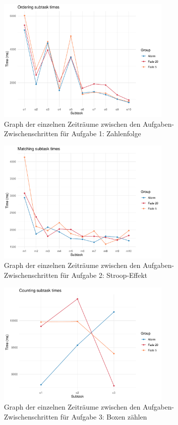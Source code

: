 \begin{figure}[H]
	\centering
	\includegraphics[width=0.75\textwidth]{./_StudyResults/timeTask1}
	\caption{Graph der einzelnen Zeiträume zwischen den Aufgaben-Zwischenschritten für Aufgabe 1: Zahlenfolge}
	\label{fig:timeTask1}
\end{figure}
\begin{figure}[H]
	\centering
	\includegraphics[width=0.75\textwidth]{./_StudyResults/timeTask2}
	\caption{Graph der einzelnen Zeiträume zwischen den Aufgaben-Zwischenschritten für Aufgabe 2: Stroop-Effekt}
	\label{fig:timeTask2}
\end{figure}

\begin{figure}[H]
	\centering
	\includegraphics[width=0.75\textwidth]{./_StudyResults/timeTask3}
	\caption{Graph der einzelnen Zeiträume zwischen den Aufgaben-Zwischenschritten für Aufgabe 3: Boxen zählen}
	\label{fig:timeTask3}
\end{figure}


